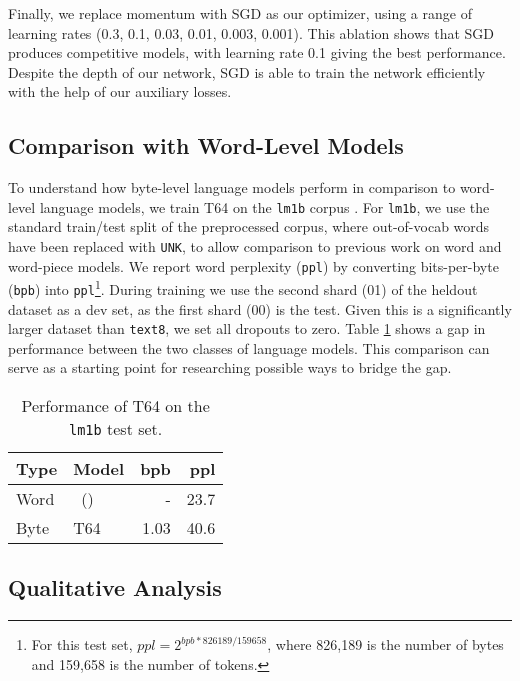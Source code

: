 \documentclass[letterpaper]{article}
\newcommand{\texteight}{\texttt{text8}}
\newcommand{\lmoneb}{\texttt{lm1b}}
\newcommand{\bigmodel}{\textsc{T64}}
\newcommand{\newcite}[1]{\citeauthor{#1}~(\citeyear{#1})}
\begin{document}
Finally, we replace momentum with SGD as our optimizer, using a range of learning rates (0.3, 0.1, 0.03, 0.01, 0.003, 0.001).
This ablation shows that SGD produces competitive models, with learning rate 0.1 giving the best performance.
Despite the depth of our network, SGD is able to train the network efficiently with the help of our auxiliary losses.

\subsection{Comparison with Word-Level Models}
To understand how byte-level language models perform in comparison to word-level language models, we train \bigmodel{} on the \lmoneb{} corpus \cite{chelba2013one}.
For \lmoneb, we use the standard train/test split of the preprocessed corpus, where out-of-vocab words have been replaced with \texttt{UNK}, to allow comparison to previous work on word and word-piece models.
We report word perplexity (\texttt{ppl}) by converting bits-per-byte (\texttt{bpb}) into \texttt{ppl}\footnote{For this test set, $ppl = 2 ^ {bpb * 826189 / 159658}$, where 826,189 is the number of bytes and 159,658 is the number of tokens.}.
During training we use the second shard (01) of the heldout dataset as a dev set, as the first shard (00) is the test.
Given this is a significantly larger dataset than \texteight{}, we set all dropouts to zero.
Table \ref{tab:lm1b} shows a gap in performance between the two classes of language models.
This comparison can serve as a starting point for researching possible ways to bridge the gap.


\begin{table}[tb]
    \centering
    \begin{tabular}{ll|rr}
        Type & Model & bpb & ppl \\ \hline
        Word &    \newcite{DBLP:journals/corr/JozefowiczVSSW16} & - & 23.7 \\
        Byte & \bigmodel{} & 1.03 & 40.6 \\
    \end{tabular}
    \caption{Performance of \bigmodel{} on the \lmoneb{} test set.}
    \label{tab:lm1b}
\end{table}




\subsection{Qualitative Analysis}
\end{document}

